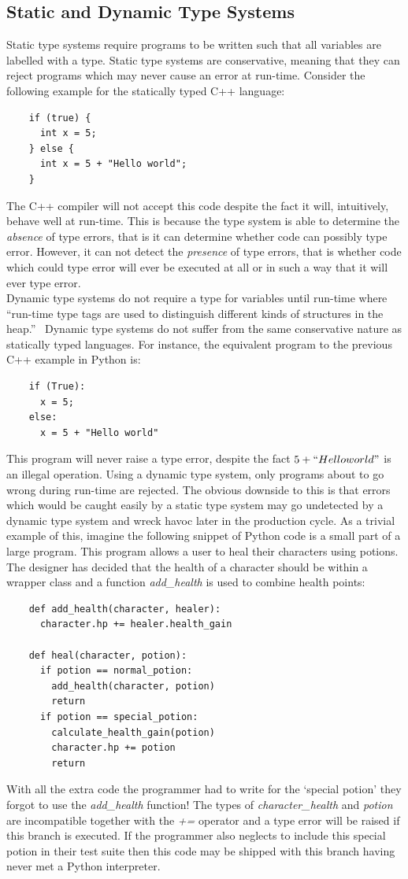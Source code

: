 \documentclass[12pt, titlepage]{article}
\begin{document}
\subsection{Static and Dynamic Type Systems}
Static type systems require programs to be written such that all variables are labelled with a type. Static type systems are conservative, meaning that they can reject programs which may never cause an error at run-time. Consider the following example for the statically typed C++ language:
\begin{lstlisting}
	if (true) {	
	  int x = 5;
	} else {
	  int x = 5 + "Hello world";
	}
\end{lstlisting}
The C++ compiler will not accept this code despite the fact it will, intuitively, behave well at run-time. This is because the type system is able to determine the \textit{absence} of type errors, that is it can determine whether code can possibly type error. However, it can not detect the \textit{presence} of type errors, that is whether code which could type error will ever be executed at all or in such a way that it will ever type error. \\
Dynamic type systems do not require a type for variables until run-time where ``run-time type tags are used to distinguish different kinds of structures in the heap.''~\cite{pierce02} Dynamic type systems do not suffer from the same conservative nature as statically typed languages. For instance, the equivalent program to the previous C++ example in Python is:
\begin{lstlisting}
	if (True):	
	  x = 5;
	else:
	  x = 5 + "Hello world"
\end{lstlisting}
This program will never raise a type error, despite the fact $5 + ``Hello  world"$ is an illegal operation. Using a dynamic type system, only programs about to go wrong during run-time are rejected. The obvious downside to this is that errors which would be caught easily by a static type system may go undetected by a dynamic type system and wreck havoc later in the production cycle. As a trivial example of this, imagine the following snippet of Python code is a small part of a large program. This program allows a user to heal their characters using potions. The designer has decided that the health of a character should be within a wrapper class and a function \textit{add\_health} is used to combine health points:
\begin{lstlisting}
	def add_health(character, healer):
	  character.hp += healer.health_gain	

	def heal(character, potion):
	  if potion == normal_potion:
	    add_health(character, potion)
	    return
	  if potion == special_potion:
	    calculate_health_gain(potion)
	    character.hp += potion		
	    return
\end{lstlisting}
With all the extra code the programmer had to write for the `special potion' they forgot to use the \textit{add\_health} function! The types of \textit{character\_health} and \textit{potion} are incompatible together with the \textit{+=} operator and a type error will be raised if this branch is executed. If the programmer also neglects to include this special potion in their test suite then this code may be shipped with this branch having never met a Python interpreter.
\end{document}
